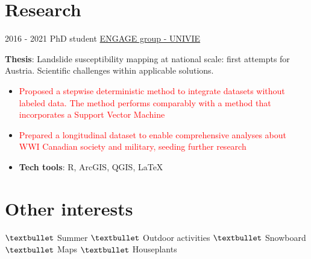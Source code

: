 \documentclass[letterpaper]{twentysecondcv} %
\begin{document}
\section{Research}
\begin{twenty}
	\twentyitem
    	{2016 - 2021}
		{}
        {PhD student}
        {\href{https://geographie.univie.ac.at/arbeitsgruppen/engage-geomorphologische-systeme-und-risikoforschung/}{ENGAGE group - UNIVIE}}
        {}
        {
       	\textbf{Thesis}: Landslide susceptibility mapping at national scale: first attempts for Austria. Scientific challenges within applicable solutions.
        {\begin{itemize}
        \item \textcolor{red}{Proposed a stepwise deterministic method to integrate datasets without labeled data. The method performs comparably with a method that incorporates a Support Vector Machine}
        \item \textcolor{red}{Prepared a longitudinal dataset to enable comprehensive analyses about WWI Canadian society and military, seeding further research}
        \item \textbf{Tech tools}: R, ArcGIS, QGIS, \large \LaTeX
		\end{itemize}}
        }
\end{twenty}

\section{Other interests}
$\textbullet$ Summer $\textbullet$ Outdoor activities $\textbullet$ Snowboard $\textbullet$ Maps $\textbullet$ Houseplants
\end{document}
